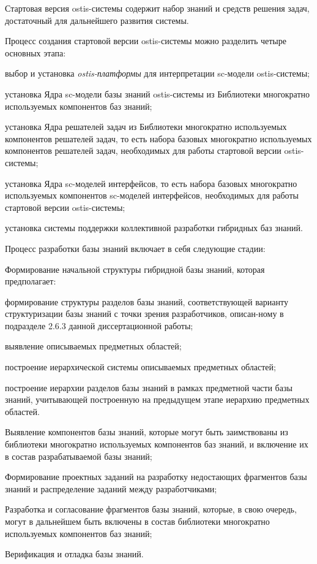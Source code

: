 Стартовая версия ostis-системы содержит набор знаний и средств решения задач, достаточный для дальнейшего развития системы.

Процесс создания стартовой версии ostis-системы можно разделить четыре основных этапа:
\begin{textitemize}
\item выбор и установка \textit{ostis-платформы} для интерпретации sc-модели ostis-системы;

\item установка Ядра sc-модели базы знаний ostis-системы из Библиотеки многократно используемых компонентов баз знаний;

\item установка Ядра решателей задач из Библиотеки многократно используемых компонентов решателей задач, то есть набора базовых многократно используемых компонентов решателей задач, необходимых для работы стартовой версии ostis-системы;

\item установка Ядра sc-моделей интерфейсов, то есть набора базовых многократно используемых компонентов sc-моделей интерфейсов, необходимых для работы стартовой версии ostis-системы;

\item установка системы поддержки коллективной разработки гибридных баз знаний.
\end{textitemize}

Процесс разработки базы знаний включает в себя следующие стадии:
\begin{textitemize}
	\item Формирование начальной структуры гибридной базы знаний, которая предполагает:
		\begin{textitemize}
			\item  формирование структуры разделов базы знаний, соответствующей варианту структуризации базы знаний с точки зрения разработчиков, описан-ному в подразделе 2.6.3 данной диссертационной работы;
			\item выявление описываемых предметных областей;
			\item построение иерархической системы описываемых предметных областей;
			\item построение иерархии разделов базы знаний в рамках предметной	части базы знаний, учитывающей построенную на предыдущем этапе иерархию предметных областей.
		\end{textitemize}
	\item Выявление компонентов базы знаний, которые могут быть заимствованы из библиотеки многократно используемых компонентов баз знаний, и включение их в состав разрабатываемой базы знаний;
	\item Формирование проектных заданий на разработку недостающих фрагментов базы знаний и распределение заданий между разработчиками;
	\item Разработка и согласование фрагментов базы знаний, которые, в свою	очередь, могут в дальнейшем быть включены в состав библиотеки многократно используемых компонентов баз знаний;
	\item Верификация и отладка базы знаний.
\end{textitemize}

